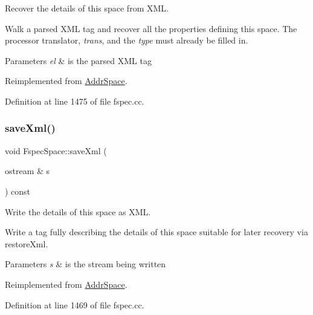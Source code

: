 Recover the details of this space from X\+ML. 

Walk a parsed X\+ML tag and recover all the properties defining this space. The processor translator, {\itshape trans}, and the {\itshape type} must already be filled in. 
\begin{DoxyParams}{Parameters}
{\em el} & is the parsed X\+ML tag \\
\hline
\end{DoxyParams}


Reimplemented from \mbox{\hyperlink{class_addr_space_aa2fe50d288eef7ea713cce99774c4eca}{Addr\+Space}}.



Definition at line 1475 of file fspec.\+cc.

\mbox{\label{class_fspec_space_a3e1fd8f03e6fc9685988a070097b6b5a}} 
\subsubsection{\texorpdfstring{saveXml()}{saveXml()}}
{\footnotesize\ttfamily void Fspec\+Space\+::save\+Xml (\begin{DoxyParamCaption}\item[{ostream \&}]{s }\end{DoxyParamCaption}) const\hspace{0.3cm}{\ttfamily [virtual]}}



Write the details of this space as X\+ML. 

Write a tag fully describing the details of this space suitable for later recovery via restore\+Xml. 
\begin{DoxyParams}{Parameters}
{\em s} & is the stream being written \\
\hline
\end{DoxyParams}


Reimplemented from \mbox{\hyperlink{class_addr_space_ac073a4d446677c54d769abba01318864}{Addr\+Space}}.



Definition at line 1469 of file fspec.\+cc.

\mbox{\label{class_fspec_space_ad68a1bf048371fd9e5b4acb2b4bbf36c}} 
